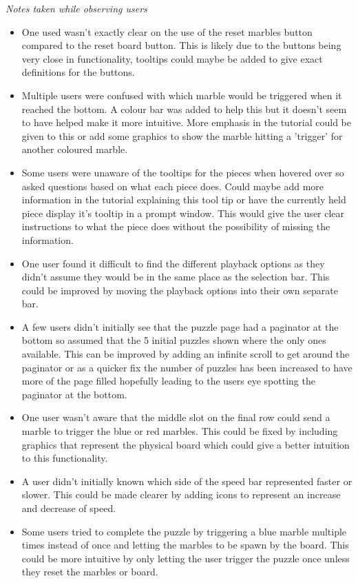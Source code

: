 \documentclass{l4proj}
\begin{document}
\emph{Notes taken while observing users}
\begin{itemize}
    \item One used wasn't exactly clear on the use of the reset marbles button compared to the reset board button. This is likely due to the buttons being very close in functionality, tooltips could maybe be added to give exact definitions for the buttons.
    \item Multiple users were confused with which marble would be triggered when it reached the bottom. A colour bar was added to help this but it doesn't seem to have helped make it more intuitive. More emphasis in the tutorial could be given to this or add some graphics to show the marble hitting a 'trigger' for another coloured marble.
    \item Some users were unaware of the tooltips for the pieces when hovered over so asked questions based on what each piece does. Could maybe add more information in the tutorial explaining this tool tip or have the currently held piece display it's tooltip in a prompt window. This would give the user clear instructions to what the piece does without the possibility of missing the information.
    \item One user found it difficult to find the different playback options as they didn't assume they would be in the same place as the selection bar. This could be improved by moving the playback options into their own separate bar.
    \item A few users didn't initially see that the puzzle page had a paginator at the bottom so assumed that the 5 initial puzzles shown where the only ones available. This can be improved by adding an infinite scroll to get around the paginator or as a quicker fix the number of puzzles has been increased to have more of the page filled hopefully leading to the users eye spotting the paginator at the bottom.
    \item One user wasn't aware that the middle slot on the final row could send a marble to trigger the blue or red marbles. This could be fixed by including graphics that represent the physical board which could give a better intuition to this functionality.
    \item A user didn't initially known which side of the speed bar represented faster or slower. This could be made clearer by adding icons to represent an increase and decrease of speed.
    \item Some users tried to complete the puzzle by triggering a blue marble multiple times instead of once and letting the marbles to be spawn by the board. This could be more intuitive by only letting the user trigger the puzzle once unless they reset the marbles or board.

\end{itemize}
\end{document}

